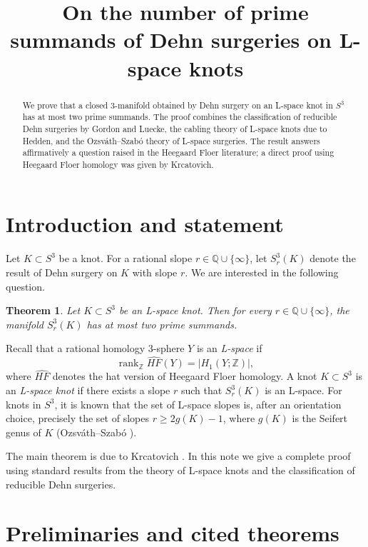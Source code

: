 \documentclass[11pt]{article}
\title{On the number of prime summands of Dehn surgeries on L-space knots}
\author{}
\date{}
\newtheorem{theorem}{Theorem}[section]
\begin{document}
\maketitle

\begin{abstract}
We prove that a closed 3-manifold obtained by Dehn surgery on an L-space knot in \(S^3\) has at most two prime summands. The proof combines the classification of reducible Dehn surgeries by Gordon and Luecke, the cabling theory of L-space knots due to Hedden, and the Ozsváth--Szabó theory of L-space surgeries. The result answers affirmatively a question raised in the Heegaard Floer literature; a direct proof using Heegaard Floer homology was given by Krcatovich.
\end{abstract}

\section{Introduction and statement}

Let \(K \subset S^3\) be a knot. For a rational slope \(r \in \mathbb{Q} \cup \{\infty\}\), let \(S^3_r(K)\) denote the result of Dehn surgery on \(K\) with slope \(r\). We are interested in the following question.

\begin{theorem}\label{thm:main}
Let \(K \subset S^3\) be an L-space knot. Then for every \(r \in \mathbb{Q} \cup \{\infty\}\), the manifold \(S^3_r(K)\) has at most two prime summands.
\end{theorem}

Recall that a rational homology 3-sphere \(Y\) is an \emph{L-space} if
\[
\operatorname{rank}_{\mathbb{Z}} \widehat{HF}(Y) = |H_1(Y;\mathbb{Z})|,
\]
where \(\widehat{HF}\) denotes the hat version of Heegaard Floer homology. A knot \(K \subset S^3\) is an \emph{L-space knot} if there exists a slope \(r\) such that \(S^3_r(K)\) is an L-space. For knots in \(S^3\), it is known that the set of L-space slopes is, after an orientation choice, precisely the set of slopes \(r \ge 2g(K)-1\), where \(g(K)\) is the Seifert genus of \(K\) (Ozsváth--Szabó \cite{OS2011}).

The main theorem is due to Krcatovich \cite{Krcatovich2015}. In this note we give a complete proof using standard results from the theory of L-space knots and the classification of reducible Dehn surgeries.

\section{Preliminaries and cited theorems}
\end{document}
